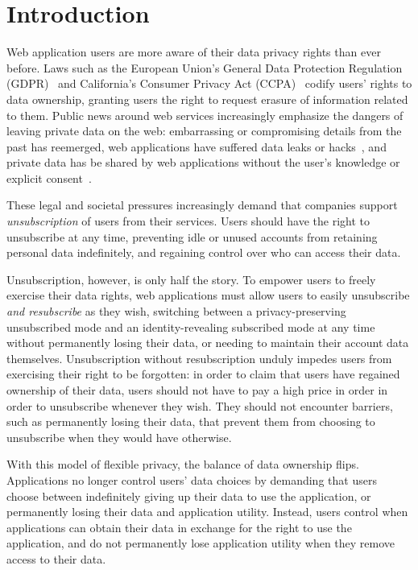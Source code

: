 \section{Introduction}

Web application users are more aware of their data privacy rights than ever before. 
Laws such as the European Union's General Data Protection Regulation (GDPR)~\cite{eu:gdpr} and
California's Consumer Privacy Act (CCPA)~\cite{ca:privacy-act} codify users' rights to 
data ownership, granting users the right to request erasure of information related to them.
%
Public news around web services increasingly emphasize the dangers of leaving private data on the
web: embarrassing or compromising details from the past has reemerged, web applications have
suffered data leaks or hacks~\cite{breach:twitter, breach:fb, breach:marriott, breach:quora}, and
private data has be shared by web applications without the user's knowledge or explicit
consent~\cite{nytimes:fb, npr:data}.

%
These legal and societal pressures increasingly demand that companies support \emph{unsubscription}
of users from their services.  Users should have the right to unsubscribe at any time, preventing
idle or unused accounts from retaining personal data indefinitely, and regaining control over who
can access their data. 
%

%
Unsubscription, however, is only half the story. To empower users to freely exercise their data
rights, web applications must allow users to easily unsubscribe \emph{and resubscribe} as they wish,
switching between a privacy-preserving unsubscribed mode and an identity-revealing subscribed mode
at any time without permanently losing their data, or needing to maintain their account data
themselves.  Unsubscription without resubscription unduly impedes users from exercising their right
to be forgotten: in order to claim that users have regained ownership of their data, users should
not have to pay a high price in order in order to unsubscribe whenever they wish. They should not
encounter barriers, such as permanently losing their data, that prevent them from choosing to
unsubscribe when they would have otherwise. 

With this model of flexible privacy, the balance of data ownership flips. Applications no longer
control users' data choices by demanding that users choose between indefinitely giving up their data
to use the application, or permanently losing their data and application utility.
Instead, users control when applications can obtain their data in exchange for the right to use the application, and do not permanently lose application utility when they remove access to their data.

